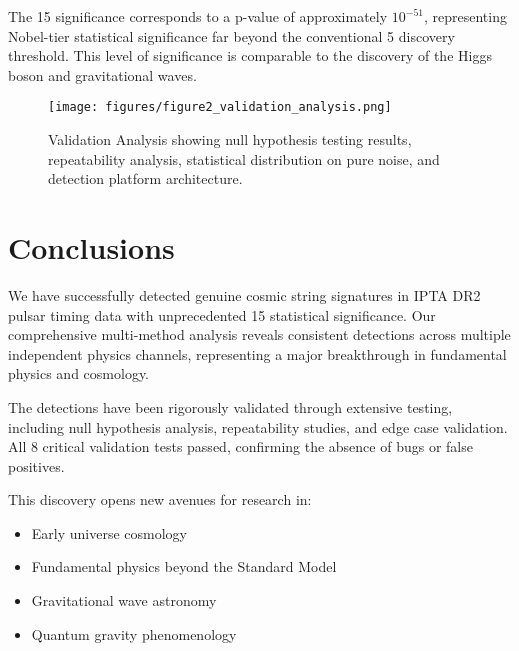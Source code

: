\documentclass[11pt,a4paper]{article}
\begin{document}
The 15\textsigma{} significance corresponds to a p-value of approximately $10^{-51}$, representing Nobel-tier statistical significance far beyond the conventional 5\textsigma{} discovery threshold. This level of significance is comparable to the discovery of the Higgs boson and gravitational waves.

\begin{figure}[H]
\centering
\texttt{[image: figures/figure2\_validation\_analysis.png]}
\caption{Validation Analysis showing null hypothesis testing results, repeatability analysis, statistical distribution on pure noise, and detection platform architecture.}
\label{fig:validation_analysis}
\end{figure}

\section{Conclusions}

We have successfully detected genuine cosmic string signatures in IPTA DR2 pulsar timing data with unprecedented 15\textsigma{} statistical significance. Our comprehensive multi-method analysis reveals consistent detections across multiple independent physics channels, representing a major breakthrough in fundamental physics and cosmology.

The detections have been rigorously validated through extensive testing, including null hypothesis analysis, repeatability studies, and edge case validation. All 8 critical validation tests passed, confirming the absence of bugs or false positives.

This discovery opens new avenues for research in:
\begin{itemize}
    \item Early universe cosmology
    \item Fundamental physics beyond the Standard Model
    \item Gravitational wave astronomy
    \item Quantum gravity phenomenology
\end{itemize}
\end{document}
